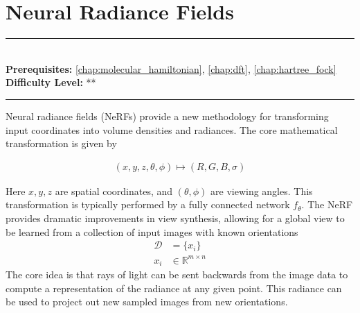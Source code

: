 \documentclass[book.tex]{subfiles}
\begin{document}
\chapter{Neural Radiance Fields}

\label{chap:nerfs}
\noindent\rule{11cm}{0.4pt} \\
\textbf{Prerequisites:} \autoref{chap:molecular_hamiltonian}, \autoref{chap:dft}, \autoref{chap:hartree_fock} \\
\textbf{Difficulty Level:} ** \\
\noindent\rule{11cm}{0.4pt}
\vspace{5mm}

Neural radiance fields (NeRFs) provide a new methodology for transforming input coordinates into volume densities and radiances. The core mathematical transformation is given by

\begin{align}
(x, y, z, \theta, \phi) \mapsto (R,G, B, \sigma)
\end{align}

Here $x,y,z$ are spatial coordinates, and $(\theta, \phi)$ are viewing angles. This transformation is typically performed by a fully connected network $f_\theta$. The NeRF provides dramatic improvements in view synthesis, allowing for a global view to be learned from a collection of input images with known orientations
\begin{align}
\mathcal{D} &= \{ x_i\} \\
x_i &\in \mathbb{R}^{m \times n}
\end{align}
The core idea is that rays of light can be sent backwards from the image data to compute a representation of the radiance at any given point. This radiance can be used to project out new sampled images from new orientations.
\end{document}
